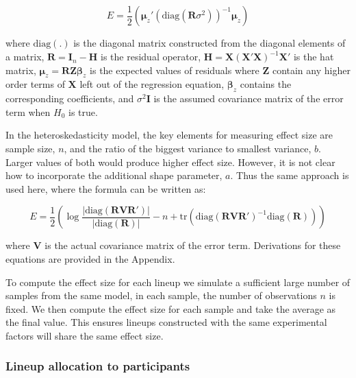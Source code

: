 \documentclass[]{interact}
\theoremstyle{plain}%
\theoremstyle{definition}
\theoremstyle{remark}
\begin{document}
\begin{equation}
E = \frac{1}{2}\left(\boldsymbol{\mu}_z'(\text{diag}(\boldsymbol{R}\sigma^2))^{-1}\boldsymbol{\mu}_z\right)
\label{eq:nonlin-effect-size}
\end{equation}

\noindent where \(\text{diag}(.)\) is the diagonal matrix constructed
from the diagonal elements of a matrix,
\(\boldsymbol{R} = \boldsymbol{I}_n - \boldsymbol{H}\) is the residual
operator,
\(\boldsymbol{H} = \boldsymbol{X}(\boldsymbol{X}'\boldsymbol{X})^{-1}\boldsymbol{X}'\)
is the hat matrix,
\(\boldsymbol{\mu}_z = \boldsymbol{R}\boldsymbol{Z}\boldsymbol{\beta}_z\)
is the expected values of residuals where \(\boldsymbol{Z}\) contain any
higher order terms of \(\boldsymbol{X}\) left out of the regression
equation, \(\boldsymbol{\beta}_z\) contains the corresponding
coefficients, and \(\sigma^2\boldsymbol{I}\) is the assumed covariance
matrix of the error term when \(H_0\) is true.

In the heteroskedasticity model, the key elements for measuring effect
size are sample size, \(n\), and the ratio of the biggest variance to
smallest variance, \(b\). Larger values of both would produce higher
effect size. However, it is not clear how to incorporate the additional
shape parameter, \(a\). Thus the same approach is used here, where the
formula can be written as:

\begin{equation}
E = \frac{1}{2}\left(\log\frac{|\text{diag}(\boldsymbol{R}\boldsymbol{V}\boldsymbol{R}')|}{|\text{diag}(\boldsymbol{R})|} - n + \text{tr}(\text{diag}(\boldsymbol{R}\boldsymbol{V}\boldsymbol{R}')^{-1}\text{diag}(\boldsymbol{R}))\right)
\label{eq:hetero-effect-size}
\end{equation}

\noindent where \(\boldsymbol{V}\) is the actual covariance matrix of
the error term. Derivations for these equations are provided in the
Appendix.

To compute the effect size for each lineup we simulate a sufficient
large number of samples from the same model, in each sample, the number
of observations \(n\) is fixed. We then compute the effect size for each
sample and take the average as the final value. This ensures lineups
constructed with the same experimental factors will share the same
effect size.

\hypertarget{lineup-allocation-to-participants}{%
\subsubsection{Lineup allocation to
participants}\label{lineup-allocation-to-participants}}
\end{document}
